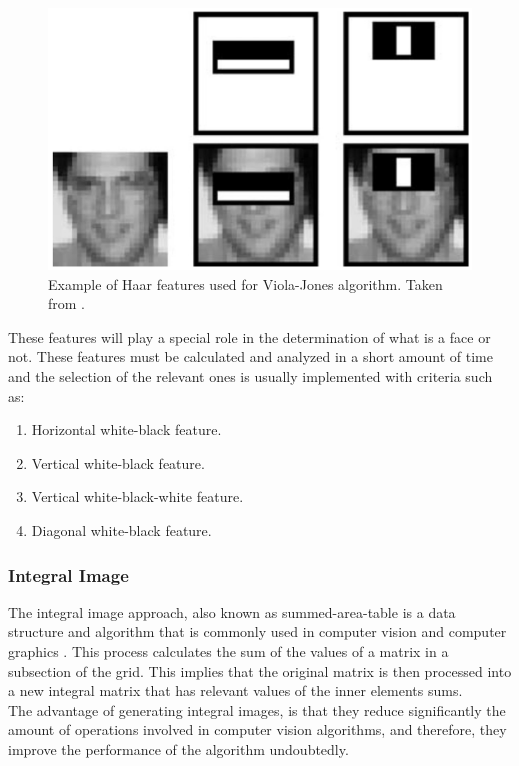 \documentclass[11pt]{report} %
\begin{document}
\begin{figure}[H]
    \centering
    \includegraphics[width=0.6\linewidth]{assets/imgs/computer_vision/viola_jones_haar_features.png}
    \caption{Example of Haar features used for Viola-Jones algorithm. Taken from \citep{cite_haar_features_example_viola_jones}.} 
    \label{fig_viola_jones_features_example}
\end{figure}

These features will play a special role in the determination of what is a face or not. These features must be calculated and analyzed in a short amount of time and the selection of the relevant ones is usually implemented with criteria such as:

\begin{enumerate}
    \item Horizontal white-black feature.
    \item Vertical white-black feature.
    \item Vertical white-black-white feature.
    \item Diagonal white-black feature.
\end{enumerate}

\subsubsection{Integral Image}

The integral image approach, also known as summed-area-table is a data structure and algorithm that is commonly used in computer vision and computer graphics \citep{cite_matlab_integral_image}. This process calculates the sum of the values of a matrix in a subsection of the grid. This implies that the original matrix is then processed into a new integral matrix that has relevant values of the inner elements sums.\\

The advantage of generating integral images, is that they reduce significantly the amount of operations involved in computer vision algorithms, and therefore, they improve the performance of the algorithm undoubtedly.\\
\end{document}
